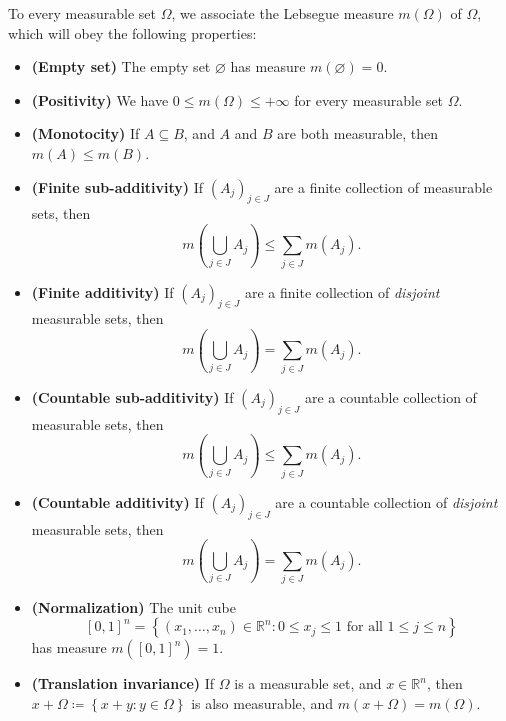 \begin{definition}
    To every measurable set \(\Omega \), we associate the Lebsegue measure \(m(\Omega )\) of \(\Omega \), which will obey the following properties:
    \begin{itemize}
        \item [(v)] \textbf{(Empty set)} The empty set \(\varnothing \) has measure \(m(\varnothing ) = 0\).  
        \item [(vi)] \textbf{(Positivity)} We have \(0 \le m(\Omega ) \le +\infty \) for every measurable set \(\Omega \).   
        \item [(vii)] \textbf{(Monotocity)} If \(A \subseteq B\), and \(A\) and \(B\) are both measurable, then \(m(A) \le m(B)\).     
        \item [(viii)] \textbf{(Finite sub-additivity)} If \((A_j)_{j \in J}\) are a finite collection of measurable sets, then 
        \[
            m \left( \bigcup_{j \in J} A_j  \right) \le \sum_{j \in J} m(A_j).  
        \]
        \item [(ix)] \textbf{(Finite additivity)} If \((A_j)_{j \in J}\) are a finite collection of \textit{disjoint} measurable sets, then 
        \[
            m \left( \bigcup_{j \in J} A_j  \right) = \sum_{j \in J} m(A_j).  
        \]
        \item [(x)] \textbf{(Countable sub-additivity)} If \((A_j)_{j \in J}\) are a countable collection of measurable sets, then 
        \[
            m\left( \bigcup_{j \in J} A_j  \right) \le \sum_{j \in J} m(A_j).  
        \]
        \item [(xi)] \textbf{(Countable additivity)} If \((A_j)_{j \in J}\) are a countable collection of \textit{disjoint} measurable sets, then 
        \[
            m \left( \bigcup_{j \in J} A_j  \right) = \sum_{j \in J} m(A_j).  
        \] 
        \item [(xii)] \textbf{(Normalization)} The unit cube
        \[
            [0, 1]^n = \left\{ (x_1, \dots , x_n) \in \mathbb{R} ^n: 0 \le x_j \le 1 \text{ for all } 1 \le j \le n  \right\} 
        \]
        has measure \(m([0, 1]^n) = 1\). 
        \item [(xiii)] \textbf{(Translation invariance)} If \(\Omega \) is a measurable set, and \(x \in \mathbb{R} ^n\), then \(x + \Omega \coloneqq \left\{ x + y: y \in \Omega  \right\} \) is also measurable, and \(m(x + \Omega ) = m (\Omega )\).     
    \end{itemize}  
\end{definition}


